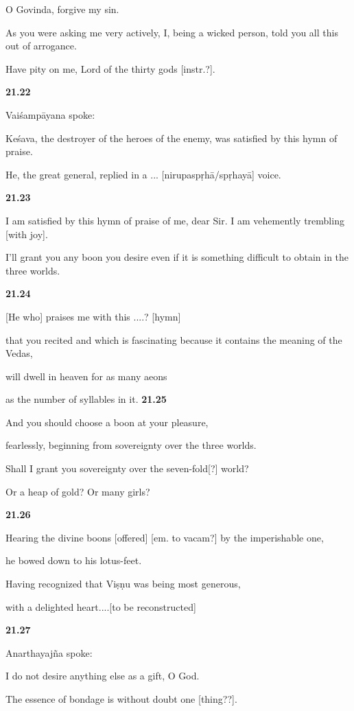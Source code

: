 \documentclass[12pt]{article} %
\begin{document}
 O Govinda, forgive my sin. 

      As you were asking me very actively, I, being a wicked person, 
      told you all this out of arrogance. 

      Have pity on me, Lord of the thirty gods [instr.?]. 

\textbf{21.22}

 Vaiśampāyana spoke: 

      Keśava, the destroyer of the heroes of the enemy, was satisfied by this hymn of praise. 

      He, the great general, replied in a ... [nirupaspṛhā/spṛhayā] voice.  

\textbf{21.23}

 I am satisfied by this hymn of praise of me, dear Sir. I am vehemently trembling [with joy]. 

      I'll grant you any boon you desire even if it is something difficult to obtain in the three worlds. 

\textbf{21.24}

 [He who] praises me with this ....?  [hymn] 

      that you recited and which is fascinating because it contains the meaning of the Vedas, 

      will dwell in heaven for as many aeons 

      as the number of syllables in it. 
\textbf{21.25}

 And you should choose a boon at your pleasure, 

fearlessly, beginning from sovereignty over the three worlds. 

      Shall I grant you sovereignty over the seven-fold[?] world? 

      Or a heap of gold? Or many girls? 

\textbf{21.26}

 Hearing  the divine boons [offered] [em. to vacam?] by the imperishable one, 

      he bowed down to his lotus-feet. 

      Having recognized that Viṣṇu was being most generous, 

      with a delighted heart....[to be reconstructed] 

\textbf{21.27}

 Anarthayajña spoke: 

      I do not desire anything else as a gift, O God. 

      The  essence of bondage is without doubt one [thing??]. 
\end{document}

